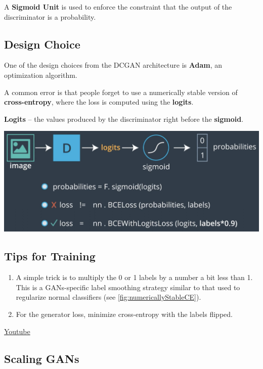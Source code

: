 A \textbf{Sigmoid Unit} is used to enforce the constraint that the output of the discriminator is a probability.

\subsection{Design Choice}

One of the design choices from the DCGAN architecture is \textbf{Adam}, an optimization algorithm. \newline

A common error is that people forget to use a numerically stable version of \textbf{cross-entropy}, where the loss is computed using the \textbf{logits}. \newline

\textbf{Logits} – the values produced by the discriminator right before the \textbf{sigmoid}.

\includegraphics[width=1\linewidth]{img//genAdvNet//gan/numericallyStableCrossEntropy.png}
\label{fig:numericallyStableCE}

\subsection{Tips for Training}

\begin{enumerate}
    \item A simple trick is to multiply the 0 or 1 labels by a number a bit less than 1. This is a GANs-specific label smoothing strategy similar to that used to regularize normal classifiers (see \autoref{fig:numericallyStableCE}).
    \item For the generator loss, minimize cross-entropy with the labels flipped.
\end{enumerate}

\href{https://www.youtube.com/watch?v=iMvn7l6HztI&t=1s}{Youtube}
\subsection{Scaling GANs}


